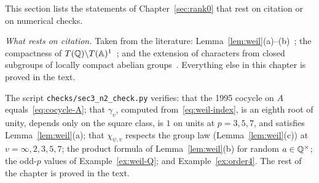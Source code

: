 This section lists the statements of Chapter~\ref{sec:rank0} that
rest on citation or on numerical checks.


\begin{remarkrev}\label{rem:sec3-status}
\emph{What rests on citation.} Taken from the literature:
Lemma~\ref{lem:weil}(a)--(b)~\cite{We64}; the compactness of
$T(\mathbb{Q})\backslash T(\mathbb{A})^1$~\cite{PR94}; and the extension of characters from
closed subgroups of locally compact abelian groups~\cite{Ro83}. Everything
else in this chapter is proved in the text.
\end{remarkrev}

\begin{remarkrev}\label{rem:verified-rank0}
The script \texttt{checks/sec3\_n2\_check.py} verifies: that the 1995
cocycle on $A$ equals~\eqref{eq:cocycle-A}; that $\gamma_v$, computed
from~\eqref{eq:weil-index}, is an eighth root of unity, depends only on
the square class, is $1$ on units at $p=3,5,7$, and satisfies
Lemma~\ref{lem:weil}(a); that $\chi_{\psi,v}$ respects the group law
(Lemma~\ref{lem:weil}(c)) at $v=\infty,2,3,5,7$; the product formula of
Lemma~\ref{lem:weil}(b) for random $a\in\mathbb{Q}^\times$; the odd-$p$ values of
Example~\ref{ex:weil-Q}; and Example~\ref{ex:order4}. The rest of the
chapter is proved in the text.
\end{remarkrev}
